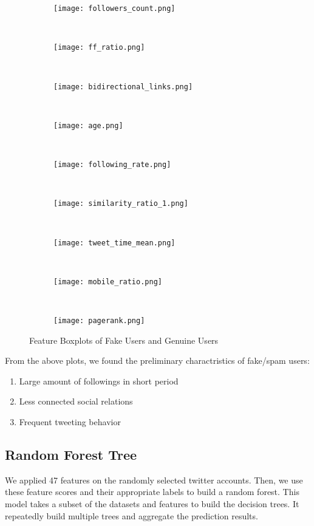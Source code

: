 \documentclass[a4paper, 12pt]{report}
\begin{document}
\begin{figure}[h!]
	\centering
	\begin{subfigure}[c]{0.3\linewidth}
		\texttt{[image: followers\_count.png]}
	\end{subfigure}
	~
	\begin{subfigure}[c]{0.3\linewidth}
		\texttt{[image: ff\_ratio.png]}
	\end{subfigure}
    ~
    \begin{subfigure}[c]{0.3\linewidth}
    	\texttt{[image: bidirectional\_links.png]}
    \end{subfigure}
	~
    \begin{subfigure}[c]{0.3\linewidth}
    	\texttt{[image: age.png]}
    \end{subfigure}
	~
	\begin{subfigure}[c]{0.3\linewidth}
		\texttt{[image: following\_rate.png]}
	\end{subfigure}
	~
	\begin{subfigure}[c]{0.3\linewidth}
		\texttt{[image: similarity\_ratio\_1.png]}
	\end{subfigure}
	~
	\begin{subfigure}[c]{0.3\linewidth}
	\texttt{[image: tweet\_time\_mean.png]}
	\end{subfigure}
	~
	\begin{subfigure}[c]{0.3\linewidth}
	\texttt{[image: mobile\_ratio.png]}
	\end{subfigure}
	~
	\begin{subfigure}[c]{0.3\linewidth}
	\texttt{[image: pagerank.png]}
	\end{subfigure}
	\caption{Feature Boxplots of Fake Users and Genuine Users}
\end{figure}

\noindent From the above plots, we found the preliminary charactristics of fake/spam users:
\begin{enumerate}
	\item Large amount of followings in short period
	\item Less connected social relations
	\item Frequent tweeting behavior
\end{enumerate}

\subsection*{Random Forest Tree}
We applied 47 features on the randomly selected twitter accounts. Then, we use these feature scores and their appropriate labels to build a random forest. This model takes a subset of the datasets and features to build the decision trees. It repeatedly build multiple trees and aggregate the prediction results. \par
\end{document}
